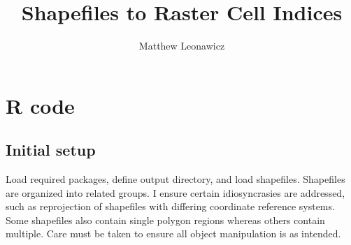 \documentclass{article}\usepackage[]{graphicx}\usepackage[]{color}
\begin{document}
\title{Shapefiles to Raster Cell Indices}
\author{Matthew Leonawicz}
\maketitle





\section{R code}

\subsection{Initial setup}

Load required packages, define output directory, and load shapefiles.
Shapefiles are organized into related groups.
I ensure certain idiosyncrasies are addressed, such as reprojection of shapefiles with differing coordinate reference systems.
Some shapefiles also contain single polygon regions whereas others contain multiple.
Care must be taken to ensure all object manipulation is as intended.
\end{document}
